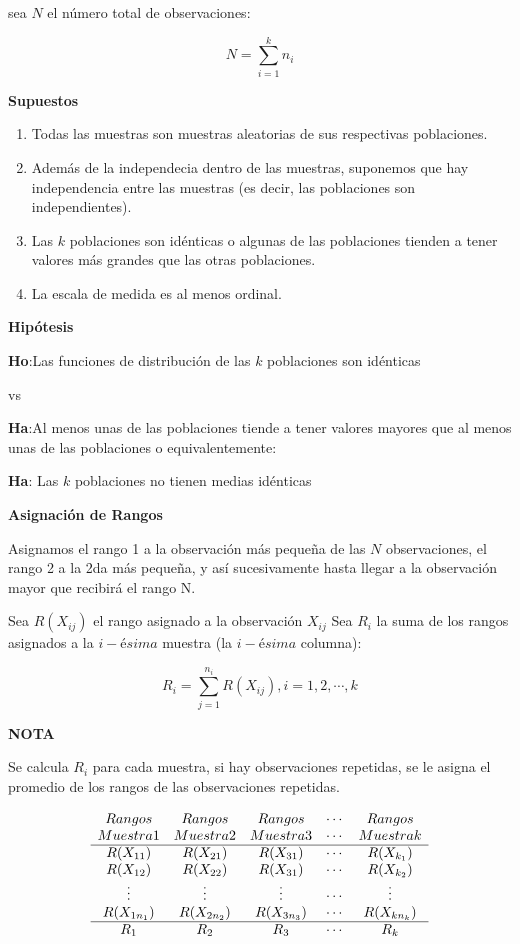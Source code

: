 \documentclass[a4paper,oneside,openany]{book}
\begin{document}
sea \(N\) el número total de observaciones:

\[ N= \sum_{i=1}^{k} n_{i}\]

\textbf{Supuestos}

\begin{enumerate}
\def\labelenumi{\arabic{enumi})}
\item
  Todas las muestras son muestras aleatorias de sus respectivas
  poblaciones.
\item
  Además de la independecia dentro de las muestras, suponemos que hay
  independencia entre las muestras (es decir, las poblaciones son
  independientes).
\item
  Las \(k\) poblaciones son idénticas o algunas de las poblaciones
  tienden a tener valores más grandes que las otras poblaciones.
\item
  La escala de medida es al menos ordinal.
\end{enumerate}

\textbf{Hipótesis}

\textbf{Ho}:Las funciones de distribución de las \(k\) poblaciones son
idénticas

vs

\textbf{Ha}:Al menos unas de las poblaciones tiende a tener valores
mayores que al menos unas de las poblaciones o equivalentemente:

\textbf{Ha}: Las \(k\) poblaciones no tienen medias idénticas

\textbf{Asignación de Rangos}

Asignamos el rango 1 a la observación más pequeña de las \(N\)
observaciones, el rango 2 a la 2da más pequeña, y así sucesivamente
hasta llegar a la observación mayor que recibirá el rango N.

Sea \(R(X_{ij})\) el rango asignado a la observación \(X_{ij}\) Sea
\(R_{i}\) la suma de los rangos asignados a la \(i-ésima\) muestra (la
\(i-ésima\) columna):

\[R_{i}=\sum_{j=1}^{n_{i}} R(X_{ij}),  i= 1, 2,\cdots,k\]

\textbf{NOTA}

Se calcula \(R_{i}\) para cada muestra, si hay observaciones repetidas,
se le asigna el promedio de los rangos de las observaciones repetidas.

\[
\begin{equation*}
\begin{array}{c c c c c} 
Rangos & Rangos & Rangos & \cdots  & Rangos \\
Muestra 1 & Muestra 2 & Muestra 3 & \cdots & Muestra k \\
\hline
R(X_{11}) &  R(X_{21}) & R(X_{31})  & \cdots & R(X_{k_{1}}) \\ 
R(X_{12}) &  R(X_{22}) & R(X_{31}) & \cdots & R(X_{k_{2}}) \\  
\vdots &  \vdots & \vdots  & \cdots &\vdots \\ 
R(X_{1n_{1}}) &R(X_{2n_{2}})   &R(X_{3n_{3}})   & \cdots &  R(X_{kn_{k}}) \\ 
\hline
R_{1} & R_{2} & R_{3} & \cdots&R_{k} \\
\end{array}
\end{equation*}
\]
\end{document}
